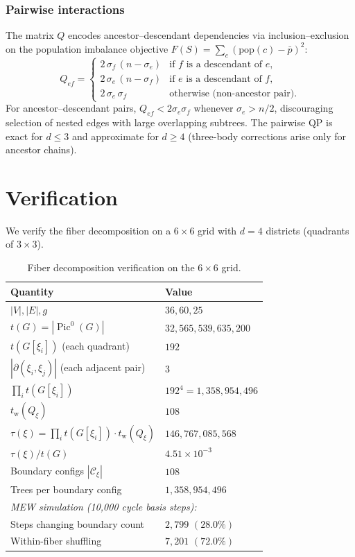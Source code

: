 \documentclass[11pt]{article}
\newcommand{\Pic}{\operatorname{Pic}^0}
\newcommand{\tw}{t_{\mathrm{w}}}
\newcommand{\pbar}{\bar{p}}
\begin{document}
\subsubsection*{Pairwise interactions}
The matrix $Q$ encodes ancestor--descendant dependencies via
inclusion--exclusion on the population imbalance objective
$F(S) = \sum_c (\mathrm{pop}(c) - \pbar)^2$:
\[
  Q_{ef} =
  \begin{cases}
    2\,\sigma_f\,(n - \sigma_e)
      & \text{if } f \text{ is a descendant of } e, \\
    2\,\sigma_e\,(n - \sigma_f)
      & \text{if } e \text{ is a descendant of } f, \\
    2\,\sigma_e\,\sigma_f
      & \text{otherwise (non-ancestor pair).}
  \end{cases}
\]
For ancestor--descendant pairs, $Q_{ef} < 2\sigma_e\sigma_f$ whenever
$\sigma_e > n/2$, discouraging selection of nested edges with large
overlapping subtrees. The pairwise QP is exact for $d \leq 3$ and approximate
for $d \geq 4$ (three-body corrections arise only for ancestor chains).


\section{Verification}\label{sec:numerics}

We verify the fiber decomposition on a $6 \times 6$ grid with $d = 4$ districts
(quadrants of $3 \times 3$).

\begin{table}[H]
\centering
\begin{tabular}{ll}
\toprule
Quantity & Value \\
\midrule
$|V|, |E|, g$ & $36, 60, 25$ \\
$t(G) = |\Pic(G)|$ & $32{,}565{,}539{,}635{,}200$ \\
$t(G[\xi_i])$ (each quadrant) & $192$ \\
$|\partial(\xi_i, \xi_j)|$ (each adjacent pair) & $3$ \\
$\prod_i t(G[\xi_i])$ & $192^4 = 1{,}358{,}954{,}496$ \\
$\tw(Q_{\xi})$ & $108$ \\
$\tau(\xi) = \prod_i t(G[\xi_i]) \cdot \tw(Q_{\xi})$ & $146{,}767{,}085{,}568$ \\
$\tau(\xi) / t(G)$ & $4.51 \times 10^{-3}$ \\
Boundary configs $|\mathcal{C}_{\xi}|$ & $108$ \\
Trees per boundary config & $1{,}358{,}954{,}496$ \\
\midrule
\multicolumn{2}{l}{\emph{MEW simulation (10{,}000 cycle basis steps):}} \\
Steps changing boundary count & $2{,}799$ $(28.0\%)$ \\
Within-fiber shuffling & $7{,}201$ $(72.0\%)$ \\
\bottomrule
\end{tabular}
\caption{Fiber decomposition verification on the $6 \times 6$ grid.}\label{tab:6x6}
\end{table}
\end{document}
